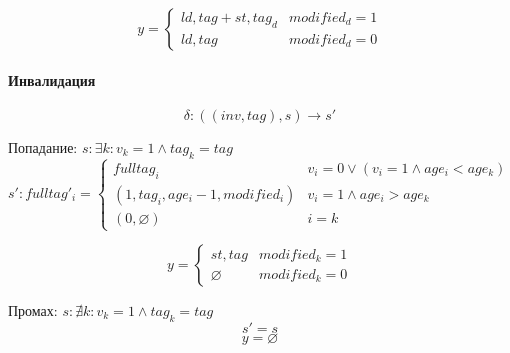 \[
y =
\begin{cases}
	ld,tag+st,tag_d & modified_d = 1 \\
	ld,tag & modified_d = 0
\end{cases}
\]

\paragraph*{Инвалидация}

$$\delta : ((inv,tag),s) \rightarrow s'$$

Попадание: $s: \exists k : v_k = 1 \land tag_k = tag$
\[
s':fulltag'_i =
\begin{cases}
	fulltag_i & v_i = 0 \lor (v_i = 1 \land age_i < age_k)\\
	(1,tag_i,age_{i}-1,modified_i) & v_i = 1 \land age_i > age_k \\
	(0,\varnothing) & i = k
\end{cases}
\]

\[
y =
\begin{cases}
	st,tag & modified_k = 1 \\
	\varnothing & modified_k = 0
\end{cases}
\]

Промах: $s: \nexists k : v_k = 1 \land tag_k = tag$
$$s' = s$$
$$y = \varnothing$$



